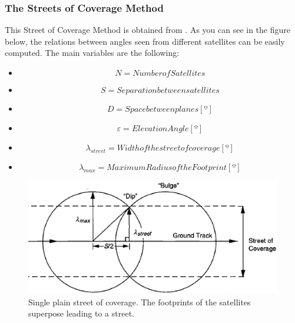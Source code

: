 \subsubsection{The Streets of Coverage Method}
This  Street of Coverage Method is obtained from 
\cite{OrbitalMechanics}. As you can see in the figure below,
 the relations between angles seen from different satellites can
 be easily computed. The main variables are the following:
 
\begin{itemize}
\item \begin{equation} N = Number of Satellites 
\end{equation}
\item \begin{equation} S = Separation between satellites
\end{equation}
\item \begin{equation} D = Space between planes [º]
\end{equation}
\item \begin{equation} \varepsilon = Elevation Angle [º]
\end{equation}
\item \begin{equation} \lambda_{street} = Width of the street of coverage[º]
\end{equation}
\item \begin{equation} \lambda_{max} = Maximum Radius of the Footprint[º]
\end{equation}
\end{itemize}
 
\begin{figure}[H]
\begin{center}
\includegraphics[scale=0.7]{PolarOrbits/planestreet.png}
\caption{Single plain street of coverage. The footprints of the satellites superpose leading to a street.}
\end{center}
\end{figure}


